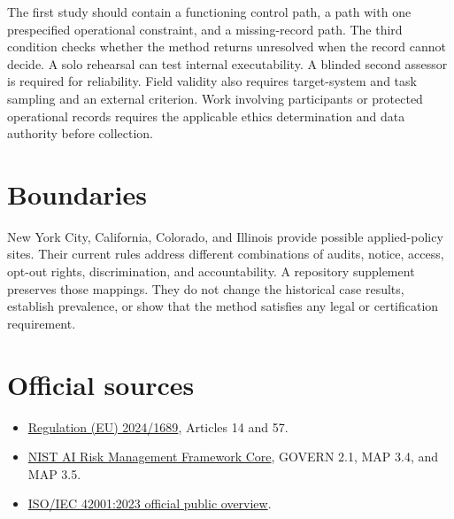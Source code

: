 \documentclass[11pt]{article}
\begin{document}
The first study should contain a functioning control path, a path with one prespecified operational constraint, and a missing-record path. The third condition checks whether the method returns unresolved when the record cannot decide. A solo rehearsal can test internal executability. A blinded second assessor is required for reliability. Field validity also requires target-system and task sampling and an external criterion. Work involving participants or protected operational records requires the applicable ethics determination and data authority before collection.

\section*{Boundaries}

New York City, California, Colorado, and Illinois provide possible applied-policy sites. Their current rules address different combinations of audits, notice, access, opt-out rights, discrimination, and accountability. A repository supplement preserves those mappings. They do not change the historical case results, establish prevalence, or show that the method satisfies any legal or certification requirement.

\section*{Official sources}

\begin{itemize}
\item \href{https://eur-lex.europa.eu/eli/reg/2024/1689/oj}{Regulation (EU) 2024/1689}, Articles 14 and 57.
\item \href{https://airc.nist.gov/airmf-resources/airmf/5-sec-core/}{NIST AI Risk Management Framework Core}, GOVERN 2.1, MAP 3.4, and MAP 3.5.
\item \href{https://www.iso.org/standard/42001}{ISO/IEC 42001:2023 official public overview}.
\end{itemize}
\end{document}
